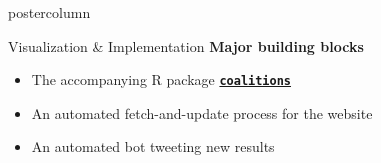 \documentclass[final,hyperref={pdfpagelabels=false}]{beamer}
\let\olditem\item
\renewcommand\item{\justifying\olditem} %
\newcommand{\bfBlue}[1]{\textcolor{koaladarkestblue}{\textbf{#1}}}
\newcommand{\darkgray}[1]{\textcolor{koaladarkgray}{#1}}
\begin{document}
\begin{frame}
\begin{columns}
\begin{column}{1\textwidth}
\begin{columns}[T]
\begin{column}{.484\textwidth}
\begin{beamercolorbox}[center,wd=\textwidth]{postercolumn}
\begin{minipage}[T]{.95\textwidth}
\begin{block}{\footnotesize Visualization \& Implementation}
\darkgray{\textbf{Major building blocks}}
\begin{minipage}{\textwidth}
\hspace{0.5in}
\begin{itemize}
  \item The accompanying R package \bfBlue{\href{https://adibender.github.io/coalitions/}{\texttt{coalitions}}}
  \item An automated fetch-and-update process for the website
  \item An automated bot tweeting new results
\end{itemize}
\end{minipage}



\end{block}
\end{minipage}
\end{beamercolorbox}
\end{column}
\end{columns}
\end{column}
\end{columns}
\end{frame}
\end{document}
